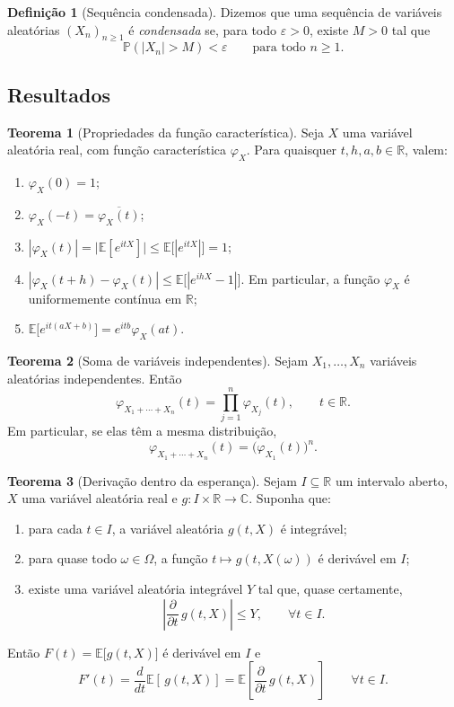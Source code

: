 \documentclass[12pt,portuguese]{article}
\theoremstyle{definition}
\newtheorem{theorem}{Teorema}
\newtheorem{definition}[definition]{Definição}
\theoremstyle{plainexercise}
\theoremstyle{starredexercise}
\theoremstyle{definition}
\begin{document}
\begin{definition}[Sequência condensada]\label{def:sequencia-condensada}
Dizemos que uma sequência de variáveis aleatórias $(X_n)_{n\geqslant1}$ é
\emph{condensada} se, para todo $\varepsilon>0$, existe $M>0$ tal que
\[
\mathbb{P}(|X_n|>M)<\varepsilon
\qquad\text{para todo }n\geqslant1.
\]
\end{definition}

\subsection{Resultados}\label{subsec:aux-resultados}

\begin{theorem}[Propriedades da função característica]\label{thm:propriedades-fc}
Seja $X$ uma variável aleatória real, com função característica $\varphi_X$. Para
quaisquer $t,h,a,b\in\mathbb{R}$, valem:
\begin{enumerate}[label=(\alph*)]
\item $\varphi_X(0)=1$;
\item $\varphi_X(-t)=\overline{\varphi_X(t)}$;
\item $|\varphi_X(t)|=\bigl|\mathbb{E}[e^{itX}]\bigr|\leqslant\mathbb{E}\bigl[|e^{itX}|\bigr]=1$;
\item $|\varphi_X(t+h)-\varphi_X(t)|\leqslant\mathbb{E}\bigl[|e^{ihX}-1|\bigr]$.
Em particular, a função $\varphi_X$ é uniformemente contínua em $\mathbb{R}$;
\item $\mathbb{E}\bigl[e^{it(aX+b)}\bigr]=e^{itb}\varphi_X(at)$.
\end{enumerate}
\end{theorem}

\begin{theorem}[Soma de variáveis independentes]
\label{thm:fc-soma-independentes}
Sejam $X_1,\ldots,X_n$ variáveis aleatórias independentes. Então
\[
\varphi_{X_1+\cdots+X_n}(t)
=\prod_{j=1}^n\varphi_{X_j}(t),
\qquad t\in\mathbb{R}.
\]
Em particular, se elas têm a mesma distribuição,
\[
\varphi_{X_1+\cdots+X_n}(t)
=\bigl(\varphi_{X_1}(t)\bigr)^n.
\]
\end{theorem}

\begin{theorem}[Derivação dentro da esperança]\label{thm:derivacao-integral}
Sejam $I\subseteq\mathbb{R}$ um intervalo aberto, $X$ uma variável aleatória
real e $g\colon I\times\mathbb{R}\to\mathbb{C}$. Suponha que:
\begin{enumerate}
\item[(i)] para cada $t\in I$, a variável aleatória $g(t,X)$ é integrável;
\item[(ii)] para quase todo $\omega\in\Omega$, a função
$t\mapsto g(t,X(\omega))$ é derivável em $I$;
\item[(iii)] existe uma variável aleatória integrável $Y$ tal que, quase
certamente,
\[
\left| \frac{\partial}{\partial t}\, g(t,X)\right|\leqslant Y,
\qquad \forall t\in I.
\]
\end{enumerate}
Então $F(t)=\mathbb{E}\bigl[g(t,X)\bigr]$ é derivável em $I$ e
\[
F'(t)
=
\frac{d}{dt} \mathbb{E}\left[\, g(t,X)\right]
=
\mathbb{E}\left[ \frac{\partial}{\partial t}\, g(t,X)\right]
\qquad \forall t\in I.
\]
\end{theorem}
\end{document}

